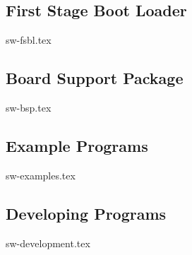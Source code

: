 \documentclass{scarv-report}
\begin{document}
\subsection{First Stage Boot Loader}
{sw-fsbl.tex}

\subsection{Board Support Package}
{sw-bsp.tex}

\subsection{Example Programs}
{sw-examples.tex}

\subsection{Developing Programs}
{sw-development.tex}


\MKEPILOGUE

\end{document}
